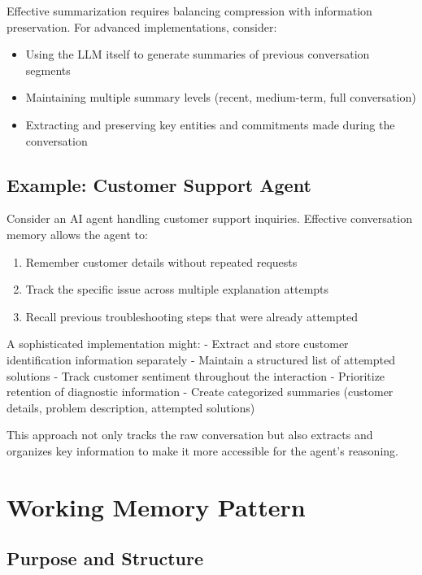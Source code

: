 \documentclass[11pt,oneside]{book}
\providecommand{\tightlist}{%
  \setlength{\itemsep}{0pt}\setlength{\parskip}{0pt}}
\begin{document}
Effective summarization requires balancing compression with information
preservation. For advanced implementations, consider:

\begin{itemize}
\tightlist
\item
  Using the LLM itself to generate summaries of previous conversation
  segments
\item
  Maintaining multiple summary levels (recent, medium-term, full
  conversation)
\item
  Extracting and preserving key entities and commitments made during the
  conversation
\end{itemize}

\subsection{Example: Customer Support
Agent}\label{example-customer-support-agent}

Consider an AI agent handling customer support inquiries. Effective
conversation memory allows the agent to:

\begin{enumerate}
\def\labelenumi{\arabic{enumi}.}
\tightlist
\item
  Remember customer details without repeated requests
\item
  Track the specific issue across multiple explanation attempts
\item
  Recall previous troubleshooting steps that were already attempted
\end{enumerate}

A sophisticated implementation might: - Extract and store customer
identification information separately - Maintain a structured list of
attempted solutions - Track customer sentiment throughout the
interaction - Prioritize retention of diagnostic information - Create
categorized summaries (customer details, problem description, attempted
solutions)

This approach not only tracks the raw conversation but also extracts and
organizes key information to make it more accessible for the agent's
reasoning.

\section{Working Memory Pattern}\label{working-memory-pattern}

\subsection{Purpose and Structure}\label{purpose-and-structure}
\end{document}
